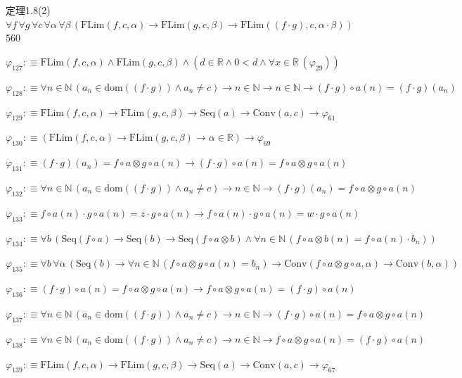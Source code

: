 \begin{fullproof}{定理1.8(2)}{$\forall f\,\forall g\,\forall c\,\forall \alpha\,\forall \beta\,(\mathrm{FLim}(f,c,\alpha) \to \mathrm{FLim}(g,c,\beta) \to \mathrm{FLim}((f \cdot g),c,\alpha \cdot \beta))$}{560}
\begin{abbrevlist}
\item $\varphi_{127} :\equiv \mathrm{FLim}(f,c,\alpha) \land \mathrm{FLim}(g,c,\beta) \land (d \in \mathbb{R} \land 0 < d \land \forall x \in \mathbb{R}\,(\varphi_{29}))$
\item $\varphi_{128} :\equiv \forall n \in \mathbb{N}\,(a_{n} \in \mathrm{dom}((f \cdot g)) \land a_{n} \neq c) \to n \in \mathbb{N} \to n \in \mathbb{N} \to (f \cdot g) \circ a(n) = (f \cdot g)(a_{n})$
\item $\varphi_{129} :\equiv \mathrm{FLim}(f,c,\alpha) \to \mathrm{FLim}(g,c,\beta) \to \mathrm{Seq}(a) \to \mathrm{Conv}(a,c) \to \varphi_{61}$
\item $\varphi_{130} :\equiv (\mathrm{FLim}(f,c,\alpha) \to \mathrm{FLim}(g,c,\beta) \to \alpha \in \mathbb{R}) \to \varphi_{69}$
\item $\varphi_{131} :\equiv (f \cdot g)(a_{n}) = f \circ a \otimes g \circ a(n) \to (f \cdot g) \circ a(n) = f \circ a \otimes g \circ a(n)$
\item $\varphi_{132} :\equiv \forall n \in \mathbb{N}\,(a_{n} \in \mathrm{dom}((f \cdot g)) \land a_{n} \neq c) \to n \in \mathbb{N} \to (f \cdot g)(a_{n}) = f \circ a \otimes g \circ a(n)$
\item $\varphi_{133} :\equiv f \circ a(n) \cdot g \circ a(n) = z \cdot g \circ a(n) \to f \circ a(n) \cdot g \circ a(n) = w \cdot g \circ a(n)$
\item $\varphi_{134} :\equiv \forall b\,(\mathrm{Seq}(f \circ a) \to \mathrm{Seq}(b) \to \mathrm{Seq}(f \circ a \otimes b) \land \forall n \in \mathbb{N}\,(f \circ a \otimes b(n) = f \circ a(n) \cdot b_{n}))$
\item $\varphi_{135} :\equiv \forall b\,\forall \alpha\,(\mathrm{Seq}(b) \to \forall n \in \mathbb{N}\,(f \circ a \otimes g \circ a(n) = b_{n}) \to \mathrm{Conv}(f \circ a \otimes g \circ a,\alpha) \to \mathrm{Conv}(b,\alpha))$
\item $\varphi_{136} :\equiv (f \cdot g) \circ a(n) = f \circ a \otimes g \circ a(n) \to f \circ a \otimes g \circ a(n) = (f \cdot g) \circ a(n)$
\item $\varphi_{137} :\equiv \forall n \in \mathbb{N}\,(a_{n} \in \mathrm{dom}((f \cdot g)) \land a_{n} \neq c) \to n \in \mathbb{N} \to (f \cdot g) \circ a(n) = f \circ a \otimes g \circ a(n)$
\item $\varphi_{138} :\equiv \forall n \in \mathbb{N}\,(a_{n} \in \mathrm{dom}((f \cdot g)) \land a_{n} \neq c) \to n \in \mathbb{N} \to f \circ a \otimes g \circ a(n) = (f \cdot g) \circ a(n)$
\item $\varphi_{139} :\equiv \mathrm{FLim}(f,c,\alpha) \to \mathrm{FLim}(g,c,\beta) \to \mathrm{Seq}(a) \to \mathrm{Conv}(a,c) \to \varphi_{67}$

\end{abbrevlist}
\end{fullproof}

